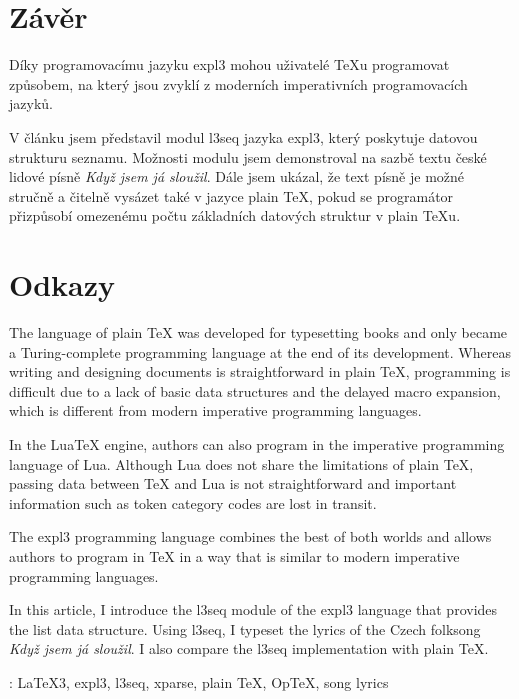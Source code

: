 \documentclass{csbulletin}
\newcommand\pkg{\textsf}
\begin{document}
\section{Závěr}
\label{sec:zaver}

\vspace*{-0.1cm}

Díky programovacímu jazyku expl3 mohou uživatelé \TeX u programovat způsobem, na který jsou zvyklí z moderních imperativních programovacích jazyků.

V článku jsem představil modul \pkg{l3seq} jazyka expl3, který poskytuje datovou strukturu seznamu. Možnosti modulu jsem demonstroval na sazbě textu české lidové písně \emph{Když jsem já sloužil}.
Dále jsem ukázal, že text písně je možné stručně a čitelně vysázet také v jazyce plain \TeX{}, pokud se programátor přizpůsobí omezenému počtu základních datových struktur v plain \TeX u.

\vspace*{-0.1cm}

\section*{Odkazy}
\vspace*{-0.1cm}
\printbibliography[heading=none]

\vspace*{-0.1cm}

\begin{summary}
\vspace*{-0.1cm}
The language of plain \TeX{} was developed for typesetting books and only became a Turing-complete programming language at the end of its development. Whereas writing and designing documents is straightforward in plain \TeX, programming is difficult due to a lack of basic data structures and the delayed macro expansion, which is different from modern imperative programming languages.

In the Lua\TeX{} engine, authors can also program in the imperative programming language of Lua. Although Lua does not share the limitations of plain \TeX, passing data between \TeX{} and Lua is not straightforward and important information such as token category codes are lost in transit.

The expl3 programming language combines the best of both worlds and allows authors to program in \TeX{} in a way that is similar to modern imperative programming languages.

In this article, I introduce the \pkg{l3seq} module of the expl3 language that provides the list data structure. Using \pkg{l3seq}, I typeset the lyrics of the Czech folksong \emph{Když jsem já sloužil}. I also compare the \pkg{l3seq} implementation with plain \TeX.

\keywords: \LaTeX3, expl3, \pkg{l3seq}, \pkg{xparse}, plain \TeX, Op\TeX, song lyrics
\end{summary}

\end{document}
